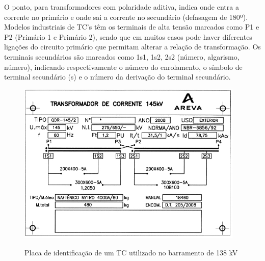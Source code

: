 \documentclass[a5paper,english,spanish,brazil]{ufsc-thesis}
\begin{document}
		O ponto, para transformadores com polaridade aditiva, indica onde entra a corrente no primário e onde sai a corrente no secundário (defasagem de 180º). Modelos industriais de TC’s têm os terminais de alta tensão marcados como P1 e P2 (Primário 1 e Primário 2), sendo que em muitos casos pode haver diferentes ligações do circuito primário que permitam alterar a relação de transformação. Os terminais secundários são marcados como 1s1, 1s2, 2s2 (número, algarismo, número), indicando respectivamente o número do enrolamento, o símbolo de terminal secundário (s) e o número da derivação do terminal secundário.\par
		\begin{figure}[htb]
		  \caption{Placa de identificação de um TC utilizado no barramento de 138 kV}
		  \centering
		  \includegraphics[width=10.8cm]{placatc.jpg}
		  \label{fig:placatc}
		\end{figure}
\end{document}
